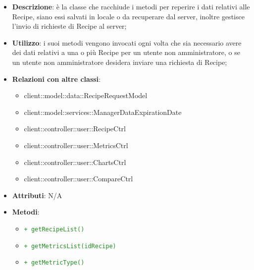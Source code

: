 			\begin{itemize}
				\item \textbf{Descrizione}: è la classe che racchiude i metodi per reperire i dati relativi alle Recipe, siano essi salvati in locale o da recuperare dal server, inoltre gestisce l'invio di richieste di Recipe al server;
				\item \textbf{Utilizzo}: i suoi metodi vengono invocati ogni volta che sia necessario avere dei dati relativi a una o più Recipe per un utente non amministratore, o se un utente non amministratore desidera inviare una richiesta di Recipe;
				\item \textbf{Relazioni con altre classi}:
					\begin{itemize}
						\item client::model::data::RecipeRequestModel
						\item client::model::services::ManagerDataExpirationDate
						\item client::controller::user::RecipeCtrl
						\item client::controller::user::MetricsCtrl
						\item client::controller::user::ChartsCtrl
						\item client::controller::user::CompareCtrl
					\end{itemize}
				\item \textbf{Attributi}: N/A
				\item \textbf{Metodi}:
				\begin{itemize}
					\item \textcolor{forestgreen}{\texttt{+ getRecipeList()}}
					\item \textcolor{forestgreen}{\texttt{+ getMetricsList(idRecipe)}}
					\item \textcolor{forestgreen}{\texttt{+ getMetricType()}}
\end{itemize}
\end{itemize}
